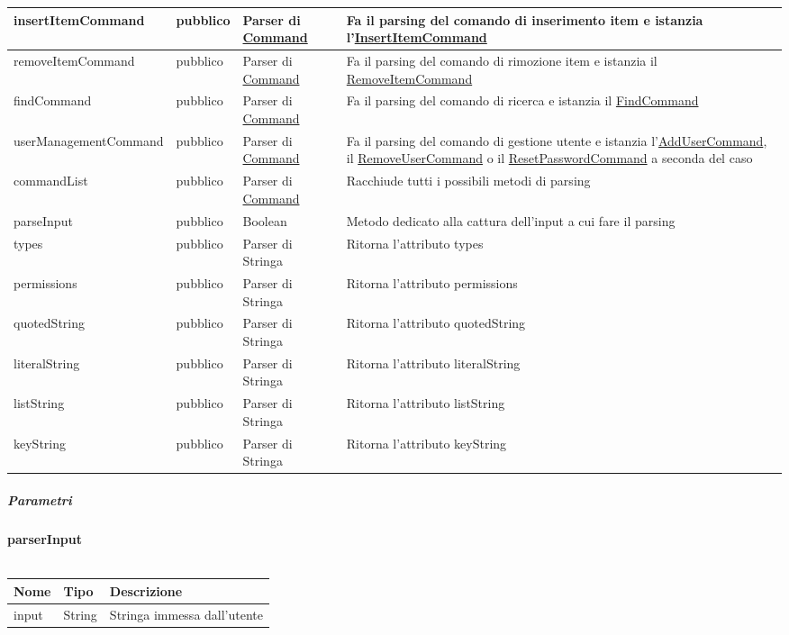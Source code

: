 \documentclass{scalatekids-article}
\begin{document}
\begin{tabular}{| p{5.5cm} | p{1.5cm} | p{2cm} | p{7.5cm} |}
  \hline
  insertItemCommand & pubblico & Parser di \hyperref[sec:actorbase::cli::models::Command]{Command} & Fa il parsing del comando di inserimento item e istanzia l'\hyperref[sec:actorbase::cli::models::InsertItemCommand]{InsertItemCommand}\\
  \hline
  removeItemCommand & pubblico & Parser di \hyperref[sec:actorbase::cli::models::Command]{Command} & Fa il parsing del comando di rimozione item e istanzia il \hyperref[sec:actorbase::cli::models::RemoveItemCommand]{RemoveItemCommand}\\
  \hline
  findCommand & pubblico & Parser di \hyperref[sec:actorbase::cli::models::Command]{Command} & Fa il parsing del comando di ricerca e istanzia il \hyperref[sec:actorbase::cli::models::FindCommand]{FindCommand}\\
  \hline
  userManagementCommand & pubblico & Parser di \hyperref[sec:actorbase::cli::models::Command]{Command} & Fa il parsing del comando di gestione utente e istanzia l'\hyperref[sec:actorbase::cli::models::AddUserCommand]{AddUserCommand}, il \hyperref[sec:actorbase::cli::models::RemoveUserCommand]{RemoveUserCommand} o il \hyperref[sec:actorbase::cli::models::ResetPasswordCommand]{ResetPasswordCommand} a seconda del caso\\
  \hline
  commandList & pubblico & Parser di \hyperref[sec:actorbase::cli::models::Command]{Command} & Racchiude tutti i possibili metodi di parsing\\
  \hline
  parseInput & pubblico & Boolean & Metodo dedicato alla cattura dell'input a cui fare il parsing\\
  \hline
  types & pubblico & Parser di Stringa & Ritorna l'attributo types\\
  \hline
  permissions & pubblico & Parser di Stringa & Ritorna l'attributo permissions\\
  \hline
  quotedString & pubblico & Parser di Stringa & Ritorna l'attributo quotedString\\
  \hline
  literalString & pubblico & Parser di Stringa & Ritorna l'attributo literalString\\
  \hline
  listString & pubblico & Parser di Stringa & Ritorna l'attributo listString\\
  \hline
  keyString & pubblico & Parser di Stringa & Ritorna l'attributo keyString\\
  \hline
\end{tabular}

\subparagraph{Parametri}


\textbf{parserInput}\\ \\
\begin{tabular}{| p{3cm} | p{3.5cm} | p{8.5cm} |}
  \hline
  Nome & Tipo & Descrizione\\
  \hline
  input & String & Stringa immessa dall'utente\\
  \hline
\end{tabular}\\
\end{document}
